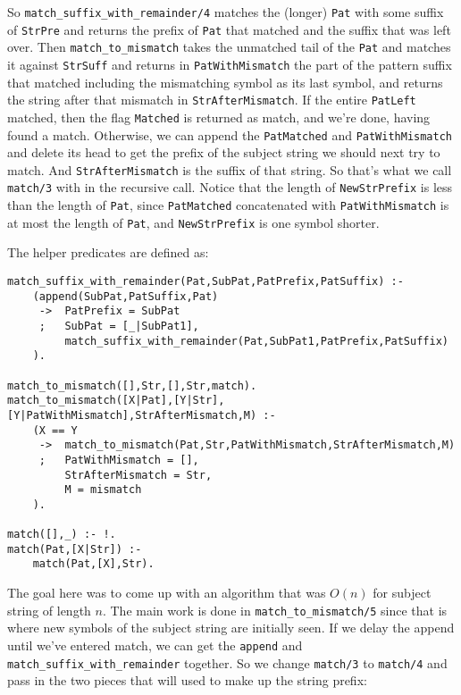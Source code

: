 So \verb|match_suffix_with_remainder/4| matches the (longer)
\verb|Pat| with some suffix of \verb|StrPre| and returns the prefix 
of \verb|Pat| that matched and the suffix that was left over.  Then
\verb|match_to_mismatch| takes the unmatched tail of the \verb|Pat| 
and matches it against \verb|StrSuff| and returns in
\verb|PatWithMismatch| the part of the pattern suffix that matched
including the mismatching symbol as its last symbol, and returns the
string after that mismatch in \verb|StrAfterMismatch|.  If the entire
\verb|PatLeft| matched, then the flag \verb|Matched| is returned 
as match, and we're done, having found a match.  Otherwise, we can
append the \verb|PatMatched| and \verb|PatWithMismatch| and delete its
head to get the prefix of the subject string we should next try to
match.  And \verb|StrAfterMismatch| is the suffix of that string.  So
that's what we call \verb|match/3| with in the recursive call.  Notice
that the length of \verb|NewStrPrefix| is less than the length of
\verb|Pat|, since \verb|PatMatched| concatenated with
\verb|PatWithMismatch| is at most the length of \verb|Pat|, and
\verb|NewStrPrefix| is one symbol shorter.

The helper predicates are defined as:

\begin{verbatim}
match_suffix_with_remainder(Pat,SubPat,PatPrefix,PatSuffix) :-
    (append(SubPat,PatSuffix,Pat)
     ->  PatPrefix = SubPat
     ;   SubPat = [_|SubPat1],
         match_suffix_with_remainder(Pat,SubPat1,PatPrefix,PatSuffix)
    ).

match_to_mismatch([],Str,[],Str,match).
match_to_mismatch([X|Pat],[Y|Str],[Y|PatWithMismatch],StrAfterMismatch,M) :-
    (X == Y
     ->  match_to_mismatch(Pat,Str,PatWithMismatch,StrAfterMismatch,M)
     ;   PatWithMismatch = [],
         StrAfterMismatch = Str,
         M = mismatch
    ).

match([],_) :- !.
match(Pat,[X|Str]) :-
    match(Pat,[X],Str).
\end{verbatim}

The goal here was to come up with an algorithm that was $O(n)$ for
subject string of length $n$.  The main work is done in
\verb|match_to_mismatch/5| since that is where new symbols of the 
subject string are initially seen.  If we delay the append until we've
entered match, we can get the \verb|append| and
\verb|match_suffix_with_remainder| together.  So we change 
\verb|match/3| to \verb|match/4| and pass in the two pieces that will 
used to make up the string prefix:

